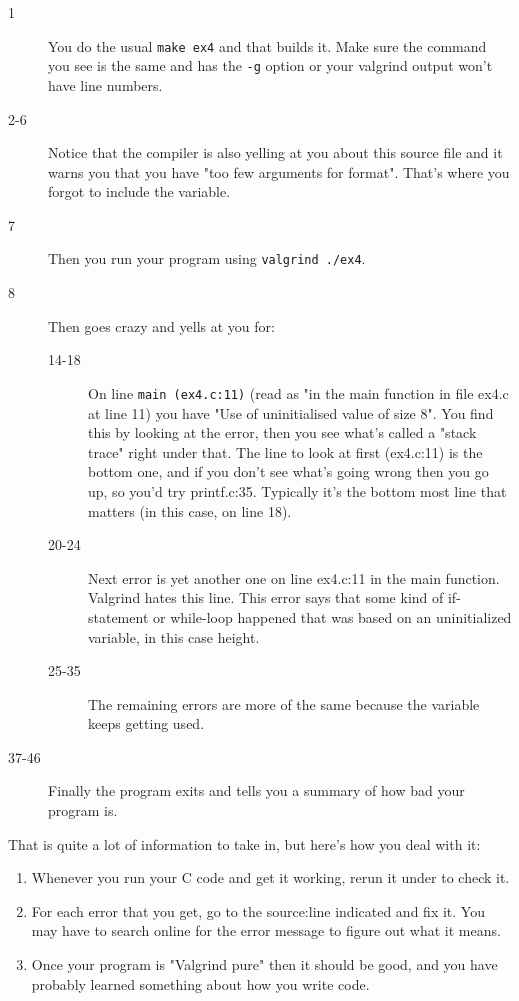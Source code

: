 \begin{description}
\item[1] You do the usual \verb|make ex4| and that builds it. Make sure the  command
    you see is the same and has the \verb|-g| option or your valgrind output won't
    have line numbers.
\item[2-6] Notice that the compiler is also yelling at you about this source file and it
    warns you that you have "too few arguments for format".  That's where you 
    forgot to include the  variable.
\item[7] Then you run your program using \verb|valgrind ./ex4|.
\item[8] Then  goes crazy and yells at you for:
    \begin{description}
        \item[14-18] On line \verb|main (ex4.c:11)| (read as "in the main function in
            file ex4.c at line 11) you have "Use of uninitialised value of size 8".
            You find this by looking at the error, then you see what's called a "stack trace"
            right under that.  The line to look at first (ex4.c:11) is the bottom one, 
            and if you don't see what's going wrong then you go up, so you'd try
            printf.c:35.  Typically it's the bottom most line that matters (in this case, on line 18).
        \item[20-24] Next error is yet another one on line ex4.c:11 in the main function. Valgrind
            hates this line.  This error says that some kind of if-statement or while-loop
            happened that was based on an uninitialized variable, in this case height.
        \item[25-35] The remaining errors are more of the same because the variable keeps getting
        used.
    \end{description}
\item[37-46] Finally the program exits and  tells you a summary of how bad
    your program is.
\end{description}

That is quite a lot of information to take in, but here's how you deal with it:

\begin{enumerate}
\item Whenever you run your C code and get it working, rerun it under 
    to check it.
\item For each error that you get, go to the source:line indicated and
    fix it.  You may have to search online for the error message to figure out
    what it means.
\item Once your program is "Valgrind pure" then it should be good, and you
    have probably learned something about how you write code.
\end{enumerate}


